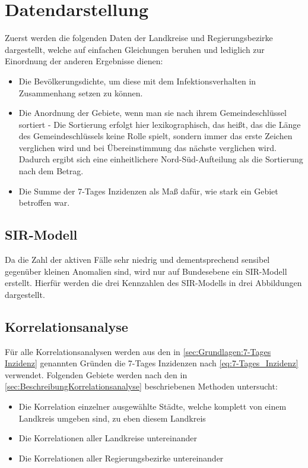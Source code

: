 \section{Datendarstellung}
Zuerst werden die folgenden Daten der Landkreise und Regierungsbezirke dargestellt, welche auf einfachen Gleichungen beruhen und lediglich zur Einordnung der anderen Ergebnisse dienen:
\begin{itemize}
    \item Die Bevölkerungsdichte, um diese mit dem Infektionsverhalten in Zusammenhang setzen zu können.
    \item Die Anordnung der Gebiete, wenn man sie nach ihrem Gemeindeschlüssel sortiert - Die Sortierung erfolgt hier lexikographisch, das heißt, das die Länge des Gemeindeschlüssels keine Rolle spielt, sondern immer das erste Zeichen verglichen wird und bei Übereinstimmung das nächste verglichen wird. Dadurch ergibt sich eine einheitlichere Nord-Süd-Aufteilung als die Sortierung nach dem Betrag.
    \item Die Summe der 7-Tages Inzidenzen als Maß dafür, wie stark ein Gebiet betroffen war.
\end{itemize}
\subsection{SIR-Modell}
Da die Zahl der aktiven Fälle sehr niedrig und dementsprechend sensibel gegenüber kleinen Anomalien sind, wird nur auf Bundesebene ein SIR-Modell erstellt. 
Hierfür werden die drei Kennzahlen des SIR-Modells in drei Abbildungen dargestellt.
\subsection{Korrelationsanalyse}
Für alle Korrelationsanalysen werden aus den in \autoref{sec:Grundlagen:7-Tages Inzidenz} genannten Gründen die 7-Tages Inzidenzen nach \autoref{eq:7-Tages_Inzidenz} verwendet. Folgenden Gebiete werden nach den in \autoref{sec:BeschreibungKorrelationsanalyse} beschriebenen Methoden untersucht:
\begin{itemize}
    \item Die Korrelation einzelner ausgewählte Städte, welche komplett von einem Landkreis umgeben sind, zu eben diesem Landkreis
    \item Die Korrelationen aller Landkreise untereinander
    \item Die Korrelationen aller Regierungsbezirke untereinander
\end{itemize}

